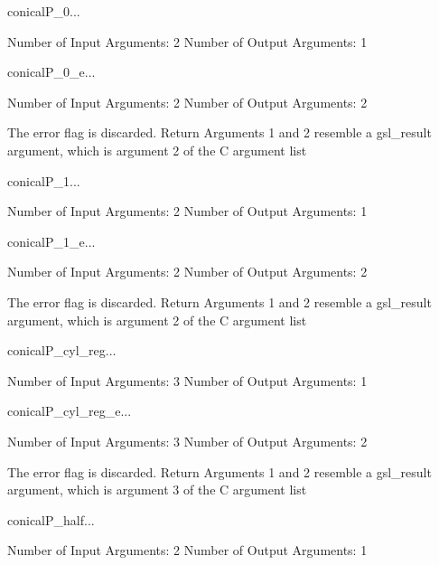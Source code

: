 \begin{funcdesc}{conicalP_0}{...}

    Number of Input  Arguments:  2
    Number of Output Arguments:  1
\end{funcdesc}

\begin{funcdesc}{conicalP_0_e}{...}

    Number of Input  Arguments:  2
    Number of Output Arguments:  2

The error flag is discarded.
Return Arguments 1 and 2 resemble a gsl_result argument,
	which is  argument 2 of the C argument list

\end{funcdesc}

\begin{funcdesc}{conicalP_1}{...}

    Number of Input  Arguments:  2
    Number of Output Arguments:  1
\end{funcdesc}

\begin{funcdesc}{conicalP_1_e}{...}

    Number of Input  Arguments:  2
    Number of Output Arguments:  2

The error flag is discarded.
Return Arguments 1 and 2 resemble a gsl_result argument,
	which is  argument 2 of the C argument list

\end{funcdesc}

\begin{funcdesc}{conicalP_cyl_reg}{...}

    Number of Input  Arguments:  3
    Number of Output Arguments:  1
\end{funcdesc}

\begin{funcdesc}{conicalP_cyl_reg_e}{...}

    Number of Input  Arguments:  3
    Number of Output Arguments:  2

The error flag is discarded.
Return Arguments 1 and 2 resemble a gsl_result argument,
	which is  argument 3 of the C argument list

\end{funcdesc}

\begin{funcdesc}{conicalP_half}{...}

    Number of Input  Arguments:  2
    Number of Output Arguments:  1
\end{funcdesc}

